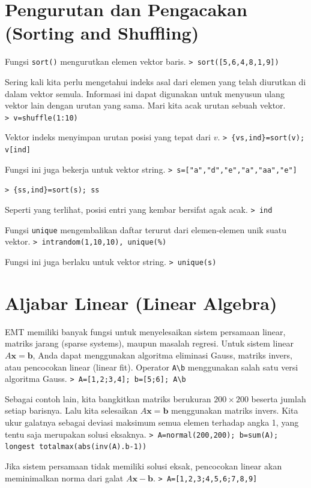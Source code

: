 \documentclass[11pt, a4paper]{article}
\newcommand{\emtcmd}[1]{\noindent\texttt{\textcolor{emtcommand}{>}\ #1}\par\smallskip}
\begin{document}
\section*{Pengurutan dan Pengacakan (Sorting and Shuffling)}

Fungsi \texttt{sort()} mengurutkan elemen vektor baris.
\emtcmd{sort([5,6,4,8,1,9])}

Sering kali kita perlu mengetahui indeks asal dari elemen yang telah diurutkan di dalam vektor semula. Informasi ini dapat digunakan untuk menyusun ulang vektor lain dengan urutan yang sama. Mari kita acak urutan sebuah vektor.
\emtcmd{v=shuffle(1:10)}

Vektor indeks menyimpan urutan posisi yang tepat dari $v$.
\emtcmd{\{vs,ind\}=sort(v); v[ind]}

Fungsi ini juga bekerja untuk vektor string.
\emtcmd{s=["a","d","e","a","aa","e"]}
\emtcmd{\{ss,ind\}=sort(s); ss}

Seperti yang terlihat, posisi entri yang kembar bersifat agak acak.
\emtcmd{ind}

Fungsi \texttt{unique} mengembalikan daftar terurut dari elemen-elemen unik suatu vektor.
\emtcmd{intrandom(1,10,10), unique(\%)}

Fungsi ini juga berlaku untuk vektor string.
\emtcmd{unique(s)}

\section*{Aljabar Linear (Linear Algebra)}

EMT memiliki banyak fungsi untuk menyelesaikan sistem persamaan linear, matriks jarang (sparse systems), maupun masalah regresi. Untuk sistem linear $A\mathbf{x}=\mathbf{b}$, Anda dapat menggunakan algoritma eliminasi Gauss, matriks invers, atau pencocokan linear (linear fit). Operator \texttt{A\textbackslash b} menggunakan salah satu versi algoritma Gauss.
\emtcmd{A=[1,2;3,4]; b=[5;6]; A\textbackslash b}

Sebagai contoh lain, kita bangkitkan matriks berukuran $200 \times 200$ beserta jumlah setiap barisnya. Lalu kita selesaikan $A\mathbf{x}=\mathbf{b}$ menggunakan matriks invers. Kita ukur galatnya sebagai deviasi maksimum semua elemen terhadap angka 1, yang tentu saja merupakan solusi eksaknya.
\emtcmd{A=normal(200,200); b=sum(A); longest totalmax(abs(inv(A).b-1))}

Jika sistem persamaan tidak memiliki solusi eksak, pencocokan linear akan meminimalkan norma dari galat $A\mathbf{x}-\mathbf{b}$.
\emtcmd{A=[1,2,3;4,5,6;7,8,9]}
\end{document}
